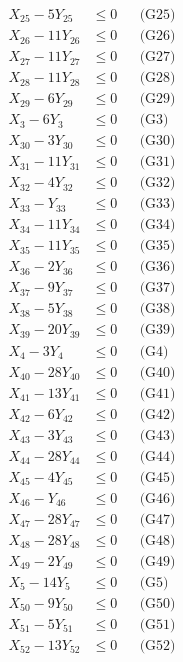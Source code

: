 \documentclass[a4paper,10pt]{article}
\begin{document}
{\begin{align}
X_{25} - 5Y_{25} &\leq 0 && \text{(G25)} \\
X_{26} - 11Y_{26} &\leq 0 && \text{(G26)} \\
X_{27} - 11Y_{27} &\leq 0 && \text{(G27)} \\
X_{28} - 11Y_{28} &\leq 0 && \text{(G28)} \\
X_{29} - 6Y_{29} &\leq 0 && \text{(G29)} \\
X_{3} - 6Y_{3} &\leq 0 && \text{(G3)} \\
X_{30} - 3Y_{30} &\leq 0 && \text{(G30)} \\
X_{31} - 11Y_{31} &\leq 0 && \text{(G31)} \\
X_{32} - 4Y_{32} &\leq 0 && \text{(G32)} \\
X_{33} - Y_{33} &\leq 0 && \text{(G33)} \\
X_{34} - 11Y_{34} &\leq 0 && \text{(G34)} \\
X_{35} - 11Y_{35} &\leq 0 && \text{(G35)} \\
X_{36} - 2Y_{36} &\leq 0 && \text{(G36)} \\
\allowbreak
X_{37} - 9Y_{37} &\leq 0 && \text{(G37)} \\
X_{38} - 5Y_{38} &\leq 0 && \text{(G38)} \\
X_{39} - 20Y_{39} &\leq 0 && \text{(G39)} \\
X_{4} - 3Y_{4} &\leq 0 && \text{(G4)} \\
X_{40} - 28Y_{40} &\leq 0 && \text{(G40)} \\
X_{41} - 13Y_{41} &\leq 0 && \text{(G41)} \\
X_{42} - 6Y_{42} &\leq 0 && \text{(G42)} \\
X_{43} - 3Y_{43} &\leq 0 && \text{(G43)} \\
X_{44} - 28Y_{44} &\leq 0 && \text{(G44)} \\
X_{45} - 4Y_{45} &\leq 0 && \text{(G45)} \\
X_{46} - Y_{46} &\leq 0 && \text{(G46)} \\
X_{47} - 28Y_{47} &\leq 0 && \text{(G47)} \\
X_{48} - 28Y_{48} &\leq 0 && \text{(G48)} \\
X_{49} - 2Y_{49} &\leq 0 && \text{(G49)} \\
X_{5} - 14Y_{5} &\leq 0 && \text{(G5)} \\
X_{50} - 9Y_{50} &\leq 0 && \text{(G50)} \\
X_{51} - 5Y_{51} &\leq 0 && \text{(G51)} \\
X_{52} - 13Y_{52} &\leq 0 && \text{(G52)} \\

\end{align}}
\end{document}
